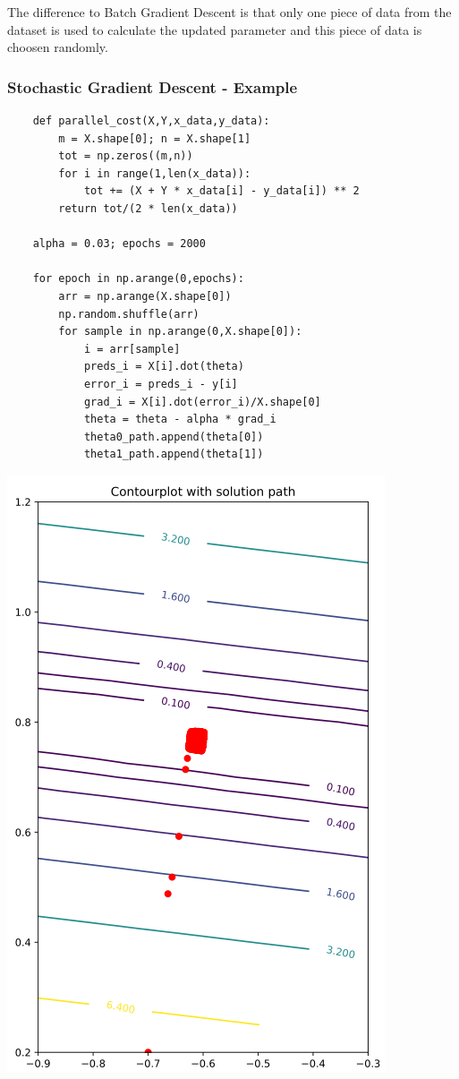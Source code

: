 \documentclass[a4paper, 11pt]{article}
\begin{document}
The difference to Batch Gradient Descent is that only one piece of data from the dataset is used to calculate the updated parameter and this piece of data is choosen randomly.

\subsubsection{Stochastic Gradient Descent - Example}

\begin{minipage}{0.55\textwidth}
	\begin{lstlisting}
	def parallel_cost(X,Y,x_data,y_data):
	    m = X.shape[0]; n = X.shape[1]
	    tot = np.zeros((m,n))
	    for i in range(1,len(x_data)):
	        tot += (X + Y * x_data[i] - y_data[i]) ** 2
	    return tot/(2 * len(x_data))
	
	alpha = 0.03; epochs = 2000
	
	for epoch in np.arange(0,epochs):
	    arr = np.arange(X.shape[0])
	    np.random.shuffle(arr)
	    for sample in np.arange(0,X.shape[0]):
	        i = arr[sample]
	        preds_i = X[i].dot(theta)
	        error_i = preds_i - y[i]
	        grad_i = X[i].dot(error_i)/X.shape[0]
	        theta = theta - alpha * grad_i
	        theta0_path.append(theta[0])
	        theta1_path.append(theta[1])
	\end{lstlisting}
\end{minipage}
\hfill
\begin{minipage}{0.4\textwidth}
		\centering
		\includegraphics[keepaspectratio, height=\linewidth]{Pictures/stochastic_gradient_descent}
		\label{fig:stochasticgradientdescent}
\end{minipage}
\end{document}
